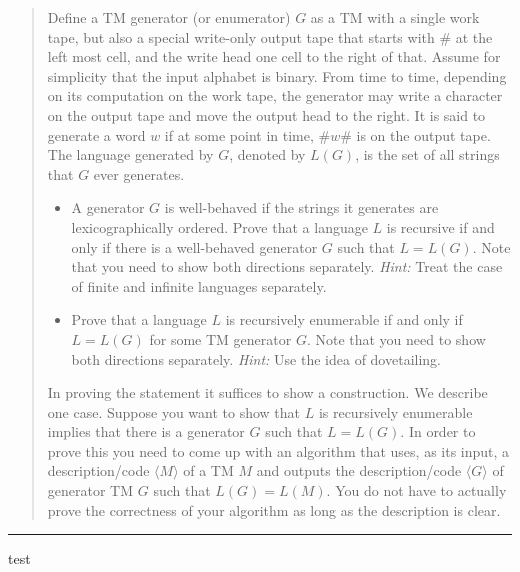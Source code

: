 \documentclass[11pt]{article}
\begin{document}

\begin{quote}
Define a TM generator (or enumerator) $G$ as a TM with a single
  work tape, but also a special write-only output tape that starts
  with $\#$ at the left most cell, and the write head one cell to the
  right of that.  Assume for simplicity that the input alphabet is
  binary.  From time to time, depending on its computation on the work
  tape, the generator may write a character on the output tape and
  move the output head to the right.  It is said to generate a word
  $w$ if at some point in time, $\#w\#$ is on the output tape. The
  language generated by $G$, denoted by $L(G)$, is the set of all
  strings that $G$ ever generates.
  \begin{itemize}
  \item A generator $G$ is well-behaved if the strings it generates
    are lexicographically ordered. Prove that a language $L$ is
    recursive if and only if there is a well-behaved generator $G$ such
    that $L=L(G)$. Note that you need
    to show both directions separately. {\em Hint:} Treat the case of finite and
    infinite languages separately.

  \item Prove that a language $L$ is recursively enumerable if and
    only if $L = L(G)$ for some TM generator $G$. Note that you need
    to show both directions separately. {\em Hint:} Use the idea of
    dovetailing.
  \end{itemize}
  In proving the statement it suffices to show a construction. We
  describe one case. Suppose you want to show that $L$ is recursively
  enumerable implies that there is a generator $G$ such that
  $L = L(G)$. In order to prove this you need to come up with an
  algorithm that uses, as its input, a description/code
  $\langle M \rangle$ of a TM $M$ and outputs the description/code
  $\langle G \rangle$ of generator TM $G$ such that $L(G) = L(M)$.  You
  do not have to actually prove the correctness of your algorithm as long as
  the description is clear.
\end{quote}
\hrule



\begin{solution}
test
\end{solution}
\end{document}
